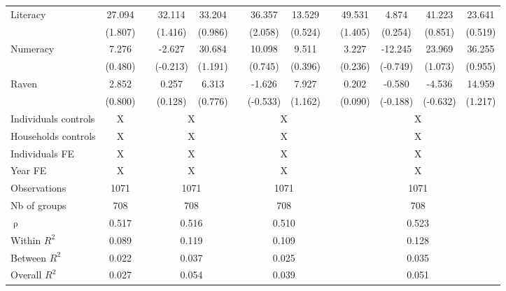 \begin{table}[htbp]
{\begin{tabular}{lcccccccccccc}
    Literacy & 27.094 &       & 32.114 & 33.204 &       & 36.357 & 13.529 &       & 49.531 & 4.874 & 41.223 & 23.641 \\
          & (1.807) &       & (1.416) & (0.986) &       & (2.058) & (0.524) &       & (1.405) & (0.254) & (0.851) & (0.519) \\
    Numeracy & 7.276 &       & -2.627 & 30.684 &       & 10.098 & 9.511 &       & 3.227 & -12.245 & 23.969 & 36.255 \\
          & (0.480) &       & (-0.213) & (1.191) &       & (0.745) & (0.396) &       & (0.236) & (-0.749) & (1.073) & (0.955) \\
    Raven & 2.852 &       & 0.257 & 6.313 &       & -1.626 & 7.927 &       & 0.202 & -0.580 & -4.536 & 14.959 \\
          & (0.800) &       & (0.128) & (0.776) &       & (-0.533) & (1.162) &       & (0.090) & (-0.188) & (-0.632) & (1.217) \\
\cmidrule{1-2}\cmidrule{4-5}\cmidrule{7-8}\cmidrule{10-13}    Individuals controls & X     &       & \multicolumn{2}{c}{X} &       & \multicolumn{2}{c}{X} &       & \multicolumn{4}{c}{X} \\
    Households controls & X     &       & \multicolumn{2}{c}{X} &       & \multicolumn{2}{c}{X} &       & \multicolumn{4}{c}{X} \\
    Individuals FE & X     &       & \multicolumn{2}{c}{X} &       & \multicolumn{2}{c}{X} &       & \multicolumn{4}{c}{X} \\
    Year FE & X     &       & \multicolumn{2}{c}{X} &       & \multicolumn{2}{c}{X} &       & \multicolumn{4}{c}{X} \\
    \midrule
    Observations & 1071  &       & \multicolumn{2}{c}{1071} &       & \multicolumn{2}{c}{1071} &       & \multicolumn{4}{c}{1071} \\
    Nb of groups & 708   &       & \multicolumn{2}{c}{708} &       & \multicolumn{2}{c}{708} &       & \multicolumn{4}{c}{708} \\
    $\uprho$ & 0.517 &       & \multicolumn{2}{c}{0.516} &       & \multicolumn{2}{c}{0.510} &       & \multicolumn{4}{c}{0.523} \\
    Within $R^2$ & 0.089 &       & \multicolumn{2}{c}{0.119} &       & \multicolumn{2}{c}{0.109} &       & \multicolumn{4}{c}{0.128} \\
    Between $R^2$ & 0.022 &       & \multicolumn{2}{c}{0.037} &       & \multicolumn{2}{c}{0.025} &       & \multicolumn{4}{c}{0.035} \\
    Overall $R^2$ & 0.027 &       & \multicolumn{2}{c}{0.054} &       & \multicolumn{2}{c}{0.039} &       & \multicolumn{4}{c}{0.051} \\

\end{tabular}}
\end{table}
